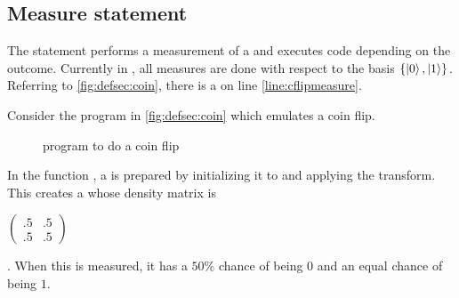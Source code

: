 \subsection{Measure statement}\label{subsec:measurestatements}

The  statement performs a measurement of a \qbit{} and
executes code depending on the outcome. Currently in \lqpl{}, all
measures are done with respect to the basis $\{\left\vert{0}\right\rangle,\left\vert{1}\right\rangle\}$. 
Referring to  \vref{fig:defsec:coin}, there is a
 on line \ref{line:cflipmeasure}. 

Consider the  program in \vref{fig:defsec:coin} which emulates a coin flip.

\begin{figure}[htbp]
\centering
{}\qquad
{}
\caption{\lqpl{} program to do a coin flip}\label{fig:defsec:coin}
\end{figure}

In the function ,  a \qbit{} is prepared by initializing it
to  and applying the \Had{} transform. This creates a \qbit{} 
whose density matrix is {\begin{singlespace}$\begin{pmatrix}.5&.5\\ 
.5&.5\end{pmatrix}$\end{singlespace}}. When
 this \qbit{} is measured, it has a $50\%$ chance of being $0$ and 
an equal chance of being $1$. 

